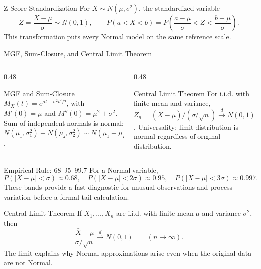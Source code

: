 \documentclass[aspectratio=169,xcolor={dvipsnames,table}]{beamer}
\begin{document}
\begin{frame}{Z-Score Standardization}
\scriptsize
For $X\sim N(\mu,\sigma^2)$, the standardized variable
\[
Z=\frac{X-\mu}{\sigma}\sim N(0,1),\qquad
P(a<X<b)=P\!\left(\frac{a-\mu}{\sigma}<Z<\frac{b-\mu}{\sigma}\right).
\]
This transformation puts every Normal model on the same reference scale.
\end{frame}

\begin{frame}{MGF, Sum-Closure, and Central Limit Theorem}
	\vspace{-0.15cm}
	\begin{columns}[T]
		\begin{column}{0.48\textwidth}
			\begin{block}{MGF and Sum-Closure}
				\footnotesize
				$M_{X}(t) = e^{\mu t + \sigma^{2}t^{2}/2}$, with $M'(0)=\mu$ and $M''(0)=\mu^{2}+\sigma^{2}$. Sum of independent normals is normal: $N(\mu_{1}, \sigma_{1}^{2}) + N(\mu_{2}, \sigma_{2}^{2}) \sim N(\mu_{1}+\mu_{2}, \sigma_{1}^{2}+\sigma_{2}^{2})$.
			\end{block}
		\end{column}
		\begin{column}{0.48\textwidth}
			\begin{alertblock}{Central Limit Theorem}
				\footnotesize
				For i.i.d. with finite mean and variance, $Z_{n} = (\bar{X}-\mu)/(\sigma/\sqrt{n}) \xrightarrow{d} N(0,1)$. Universality: limit distribution is normal regardless of original distribution.
			\end{alertblock}
		\end{column}
	\end{columns}
\end{frame}

\begin{frame}{Empirical Rule: 68--95--99.7}
\scriptsize
For a Normal variable,
\[
P(|X-\mu|<\sigma)\approx0.68,\quad
P(|X-\mu|<2\sigma)\approx0.95,\quad
P(|X-\mu|<3\sigma)\approx0.997.
\]
These bands provide a fast diagnostic for unusual observations and process
variation before a formal tail calculation.
\end{frame}

\begin{frame}{Central Limit Theorem}
\scriptsize
If $X_1,\ldots,X_n$ are i.i.d. with finite mean $\mu$ and variance $\sigma^2$,
then
\[
\frac{\bar X-\mu}{\sigma/\sqrt n}\xrightarrow{d}N(0,1)
\qquad(n\to\infty).
\]
The limit explains why Normal approximations arise even when the original data
are not Normal.
\end{frame}
\end{document}
